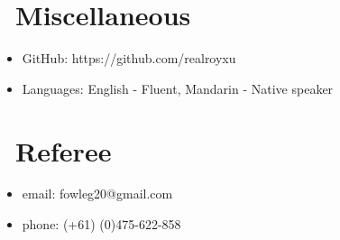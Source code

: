 \documentclass{resume}
\begin{document}
\section{\faInfo\ Miscellaneous}
\begin{itemize}[parsep=0.5ex]
  \item GitHub: https://github.com/realroyxu
  \item Languages: English - Fluent, Mandarin - Native speaker
\end{itemize}



\section{\faFax\ Referee}
\begin{itemize}[parsep=0.5ex]
  \item email: fowleg20@gmail.com
  \item phone: (+61) (0)475-622-858
\end{itemize}
%
%
\end{document}
